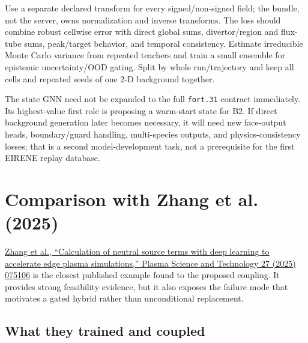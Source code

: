 \documentclass[11pt]{article}
\begin{document}
Use a separate declared transform for every signed/non-signed field; the bundle, not the server, owns normalization and inverse transforms. The loss should combine robust cellwise error with direct global sums, divertor/region and flux-tube sums, peak/target behavior, and temporal consistency. Estimate irreducible Monte Carlo variance from repeated teachers and train a small ensemble for epistemic uncertainty/OOD gating. Split by whole run/trajectory and keep all cells and repeated seeds of one 2-D background together.

The state GNN need not be expanded to the full \texttt{fort.31} contract immediately. Its highest-value first role is proposing a warm-start state for B2. If direct background generation later becomes necessary, it will need new face-output heads, boundary/guard handling, multi-species outputs, and physics-consistency losses; that is a second model-development task, not a prerequisite for the first EIRENE replay database.

\section{Comparison with Zhang et al. (2025)}

\href{https://doi.org/10.1088/2058-6272/add1b0}{Zhang et al., ``Calculation of neutral source terms with deep learning to accelerate edge plasma simulations,'' Plasma Science and Technology 27 (2025) 075106} is the closest published example found to the proposed coupling. It provides strong feasibility evidence, but it also exposes the failure mode that motivates a gated hybrid rather than unconditional replacement.

\subsection{What they trained and coupled}
\end{document}
